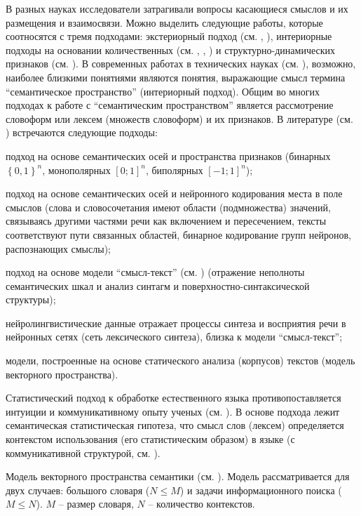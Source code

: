 В разных науках исследователи затрагивали вопросы касающиеся смыслов и их размещения и взаимосвязи. Можно выделить следующие работы, которые соотносятся с тремя подходами: экстериорный подход (см. , ), интериорные подходы на основании количественных (см. , , ) и структурно-динамических признаков (см. ).
В современных работах в технических науках (см. ), возможно, наиболее близкими понятиями являются понятия, выражающие смысл термина ``семантическое пространство'' (интериорный подход).
Общим во многих подходах к работе с ``семантическим пространством'' является рассмотрение словоформ или лексем (множеств словоформ) и их признаков. В литературе (см. ) встречаются следующие подходы:
\begin{textitemize}
	\item подход на основе семантических осей и пространства признаков (бинарных $\left\lbrace 0,1\right\rbrace ^{n}$, монополярных $\left[0;1\right]^{n}$, биполярных $\left[-1;1\right]^{n}$);
	\item подход на основе семантических осей и нейронного кодирования места в поле смыслов (слова и словосочетания имеют области (подмножества) значений, связываясь другими частями речи как включением и пересечением, тексты соответствуют пути связанных областей, бинарное кодирование групп нейронов, распознающих смыслы);
	\item подход на основе модели ``смысл-текст'' (см. ) (отражение неполноты семантических шкал и анализ синтагм и поверхностно-синтаксической структуры);
	\item нейролингвистические данные отражает процессы синтеза и восприятия речи в нейронных сетях (сеть лексического синтеза), близка к модели ``смысл-текст'';
	\item модели, построенные на основе статического анализа (корпусов) текстов (модель векторного пространства).
\end{textitemize}

Статистический подход к обработке естественного языка противопоставляется интуиции и коммуникативному опыту ученых (см. ). В основе подхода лежит семантическая статистическая гипотеза, что смысл слов (лексем) определяется контекстом использования (его статистическим образом) в языке (с коммуникативной структурой, см. ).

Модель векторного пространства семантики (см. ). Модель рассматривается для двух случаев: большого словаря ($N\leq{M}$) и задачи информационного поиска ($M\leq{N}$). $M$ -- размер словаря, $N$ -- количество контекстов.

